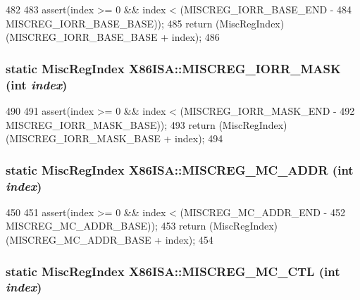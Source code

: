 \begin{DoxyCode}
482     {
483         assert(index >= 0 && index < (MISCREG_IORR_BASE_END -
484                                       MISCREG_IORR_BASE_BASE));
485         return (MiscRegIndex)(MISCREG_IORR_BASE_BASE + index);
486     }
\end{DoxyCode}
\hypertarget{namespaceX86ISA_af40958c001ad1b78bdd1174e2964d26a}{
\subsubsection[{MISCREG\_\-IORR\_\-MASK}]{\setlength{\rightskip}{0pt plus 5cm}static {\bf MiscRegIndex} X86ISA::MISCREG\_\-IORR\_\-MASK (int {\em index})}}
\label{namespaceX86ISA_af40958c001ad1b78bdd1174e2964d26a}



\begin{DoxyCode}
490     {
491         assert(index >= 0 && index < (MISCREG_IORR_MASK_END -
492                                       MISCREG_IORR_MASK_BASE));
493         return (MiscRegIndex)(MISCREG_IORR_MASK_BASE + index);
494     }
\end{DoxyCode}
\hypertarget{namespaceX86ISA_aec4e5e9a0054e6f569f57a147949262d}{
\subsubsection[{MISCREG\_\-MC\_\-ADDR}]{\setlength{\rightskip}{0pt plus 5cm}static {\bf MiscRegIndex} X86ISA::MISCREG\_\-MC\_\-ADDR (int {\em index})}}
\label{namespaceX86ISA_aec4e5e9a0054e6f569f57a147949262d}



\begin{DoxyCode}
450     {
451         assert(index >= 0 && index < (MISCREG_MC_ADDR_END -
452                                       MISCREG_MC_ADDR_BASE));
453         return (MiscRegIndex)(MISCREG_MC_ADDR_BASE + index);
454     }
\end{DoxyCode}
\hypertarget{namespaceX86ISA_ada6bc06a550215bc7c4b09d9d1f747e5}{
\subsubsection[{MISCREG\_\-MC\_\-CTL}]{\setlength{\rightskip}{0pt plus 5cm}static {\bf MiscRegIndex} X86ISA::MISCREG\_\-MC\_\-CTL (int {\em index})}}
\label{namespaceX86ISA_ada6bc06a550215bc7c4b09d9d1f747e5}



